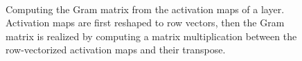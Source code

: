 \begin{figure}[t]
\begin{center}
	\\
	\caption[Computing the Gram matrix from activation maps]{Computing the Gram matrix from the activation maps of a layer. Activation maps are first reshaped to row vectors, then the Gram matrix is realized by computing a matrix multiplication between the row-vectorized activation maps and their transpose.}
	\vspace{-0.65cm}
	\label{fig:gram_matrix}
\end{center}
\end{figure}